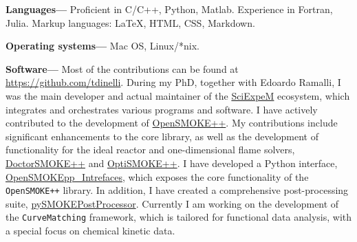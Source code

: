 {\bf Languages---}
Proficient in C/C++, Python, Matlab. Experience in Fortran, Julia. Markup languages: \LaTeX, HTML, CSS, Markdown.

{\bf Operating systems---}
Mac OS, Linux/*nix.

{\bf Software---}
Most of the contributions can be found at \href{https://github.com/tdinelli}{https://github.com/tdinelli}. During my PhD, together with Edoardo Ramalli, I was the main developer and actual maintainer of the \href{https://sciexpem.polimi.it/}{SciExpeM} ecosystem, which integrates and orchestrates various programs and software. I have actively contributed to the development of \href{https://www.opensmokepp.polimi.it/}{OpenSMOKE++}. My contributions include significant enhancements to the core library, as well as the development of functionality for the ideal reactor and one-dimensional flame solvers, \href{https://www.opensmokepp.polimi.it/}{DoctorSMOKE++} and \href{https://github.com/burn-research/OptiSMOKE_toolbox}{OptiSMOKE++}. I have developed a Python interface, \href{https://github.com/tdinelli/OpenSMOKEpp_Interfaces}{OpenSMOKEpp\_Intrefaces}, which exposes the core functionality of the {\tt OpenSMOKE++} library. In addition, I have created a comprehensive post-processing suite, \href{https://github.com/tdinelli/pySMOKEPostProcessor}{pySMOKEPostProcessor}. Currently I am working on the development of the \texttt{CurveMatching} framework, which is tailored for functional data analysis, with a special focus on chemical kinetic data.
% 
%     
